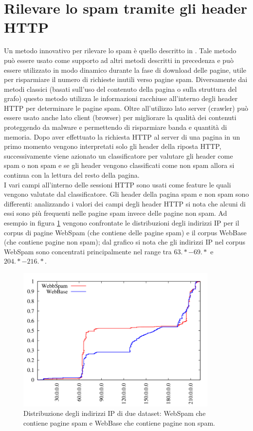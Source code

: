 \section{Rilevare lo spam tramite gli header HTTP}
Un metodo innovativo per rilevare lo spam è quello descritto in \cite{Webb:2008:PWS:1458082.1458129}. Tale metodo può essere usato come supporto ad altri metodi descritti in precedenza e può essere utilizzato in modo dinamico durante la fase di download delle pagine, utile per risparmiare il numero di richieste inutili verso pagine spam. Diversamente dai metodi classici (basati sull'uso del contenuto della pagina o sulla struttura del grafo) questo metodo utilizza le informazioni racchiuse all'interno degli header HTTP per determinare le pagine spam. Oltre all'utilizzo lato server (crawler) può essere usato anche lato client (browser) per migliorare la qualità dei contenuti proteggendo da malware e permettendo di risparmiare banda e quantità di memoria. Dopo aver  effettuato la richiesta HTTP al server di una pagina in un primo momento vengono interpretati solo gli header della riposta HTTP, successivamente viene azionato un classificatore per valutare gli header come spam o non spam e se gli header vengono classificati come non spam allora si continua con la lettura del resto della pagina.\\ 
I vari campi all'interno delle sessioni HTTP sono usati come feature le quali vengono  valutate dal classificatore. Gli header della pagina spam e non spam sono differenti: analizzando i valori dei campi degli header HTTP si nota che alcuni di essi sono più frequenti nelle pagine spam invece delle pagine non spam. Ad esempio in figura \ref{img:webb1} vengono confrontate le distribuzioni degli indirizzi IP per il corpus di pagine WebSpam (che contiene delle pagine spam) e il corpus WebBase (che contiene pagine non spam); dal grafico si nota che gli indirizzi IP nel corpus WebSpam sono concentrati principalmente nel range tra \(63.* - 69.*\) e \(204.* - 216.*\).
\begin{figure}
\centering
\includegraphics[width=10cm]{immagini/altre/webb.png}
\caption{Distribuzione degli indirizzi IP di due dataset: WebSpam che contiene pagine spam e WebBase che contiene pagine non spam.}
\label{img:webb1}
\end{figure}
